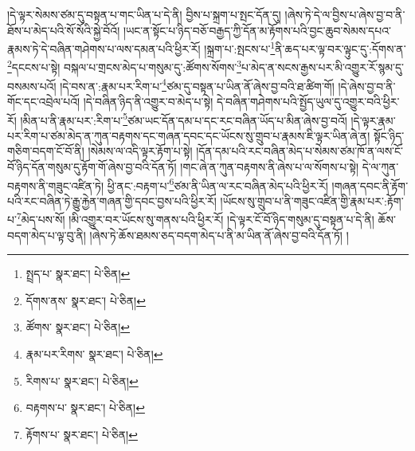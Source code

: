 །དེ་ལྟར་སེམས་ཙམ་དུ་བསྟན་པ་གང་ཡིན་པ་དེ་ནི། བྱིས་པ་སྐྲག་པ་སྤང་དོན་དུ། །ཞེས་ཏེ་དེ་ལ་བྱིས་པ་ཞེས་བྱ་བ་ནི་ཐོས་པ་མེད་པའི་སོ་སོའི་སྐྱེ་བོའོ། །ཡང་ན་སྟོང་པ་ཉིད་བཅོ་བརྒྱད་ཀྱི་དོན་མ་རྟོགས་པའི་བྱང་ཆུབ་སེམས་དཔའ་རྣམས་ཏེ་དེ་བཞིན་གཤེགས་པ་ལས་དམན་པའི་ཕྱིར་རོ། །སྐྲག་པ་:སྤངས་པ་\footnote{སྤྲད་པ་  སྣར་ཐང་།  པེ་ཅིན། }ནི་ཆད་པར་ལྟ་བར་ལྟུང་དུ་:དོགས་ན་\footnote{དོགས་ནས་  སྣར་ཐང་།  པེ་ཅིན། }དངངས་པ་སྟེ། བསྐལ་པ་གྲངས་མེད་པ་གསུམ་དུ་:ཚོགས་སོགས་\footnote{ཚོགས་  སྣར་ཐང་།  པེ་ཅིན། }པ་མེད་ན་སངས་རྒྱས་པར་མི་འགྱུར་རོ་སྙམ་དུ་བསམས་པའོ། །དེ་བས་ན་:རྣམ་པར་རིག་པ་\footnote{རྣམ་པར་རིགས་  སྣར་ཐང་།  པེ་ཅིན། }ཙམ་དུ་བསྟན་པ་ཡིན་ནོ་ཞེས་བྱ་བའི་ཐ་ཚིག་གོ། །དེ་ཞེས་བྱ་བ་ནི་གོང་དང་འབྲེལ་པའོ། །དེ་བཞིན་ཉིད་ནི་འགྱུར་བ་མེད་པ་སྟེ། དེ་བཞིན་གཤེགས་པའི་སྤྱོད་ཡུལ་དུ་འགྱུར་བའི་ཕྱིར་རོ། །མིན་པ་ནི་རྣམ་པར་:རིག་པ་\footnote{རིགས་པ་  སྣར་ཐང་།  པེ་ཅིན། }ཙམ་ཡང་དོན་དམ་པ་དང་རང་བཞིན་ཡོད་པ་མིན་ཞེས་བྱ་བའོ། །དེ་ལྟར་རྣམ་པར་རིག་པ་ཙམ་མེད་ན་ཀུན་བརྟགས་དང་གཞན་དབང་དང་ཡོངས་སུ་གྲུབ་པ་རྣམས་ཇི་ལྟར་ཡིན་ཞེ་ན། སྟོང་ཉིད་གཅིག་བདག་ངོ་བོ་ནི། །སེམས་ལ་འདི་ལྟར་རྟོག་པ་སྟེ། །དོན་དམ་པའི་རང་བཞིན་མེད་པ་སེམས་ཙམ་ཁོ་ན་ལས་ངོ་བོ་ཉིད་དོན་གསུམ་དུ་རྟོག་གོ་ཞེས་བྱ་བའི་དོན་ཏོ། །གང་ཞེ་ན་ཀུན་བརྟགས་ནི་ཞེས་པ་ལ་སོགས་པ་སྟེ། དེ་ལ་ཀུན་བརྟགས་ནི་གཟུང་འཛིན་ཏེ། ཕྱི་ནང་:བརྟག་པ་\footnote{བརྟགས་པ་  སྣར་ཐང་།  པེ་ཅིན། }ཙམ་ནི་ཡིན་ལ་རང་བཞིན་མེད་པའི་ཕྱིར་རོ། །གཞན་དབང་ནི་རྟོག་པའི་རང་བཞིན་ཏེ་རྒྱུ་རྐྱེན་གཞན་གྱི་དབང་བྱས་པའི་ཕྱིར་རོ། །ཡོངས་སུ་གྲུབ་པ་ནི་གཟུང་འཛིན་གྱི་རྣམ་པར་:རྟོག་པ་\footnote{རྟོགས་པ་  སྣར་ཐང་།  པེ་ཅིན། }མེད་པས་སོ། །མི་འགྱུར་བར་ཡོངས་སུ་གནས་པའི་ཕྱིར་རོ། །དེ་ལྟར་ངོ་བོ་ཉིད་གསུམ་དུ་བསྟན་པ་དེ་ནི། ཆོས་བདག་མེད་པ་ལྟ་བུ་ནི། །ཞེས་ཏེ་ཆོས་ཐམས་ཅད་བདག་མེད་པ་ནི་མ་ཡིན་ནོ་ཞེས་བྱ་བའི་དོན་ཏོ། །
